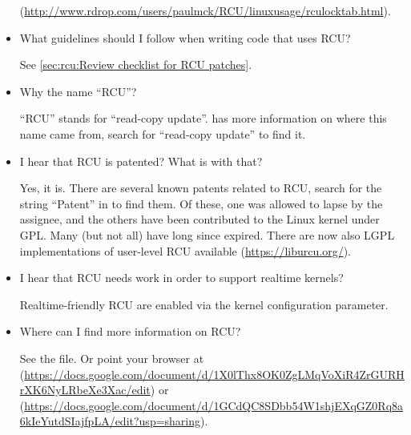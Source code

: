 \begin{itemize}
  (\url{http://www.rdrop.com/users/paulmck/RCU/linuxusage/rculocktab.html}).

\item What guidelines should I follow when writing code that uses RCU\@?

  See \cref{sec:rcu:Review checklist for RCU patches}.

\item Why the name ``RCU\@''?

  ``RCU'' stands for ``read-copy update''.
  has more information on where this name came from, search
  for ``read-copy update'' to find it.

\item I hear that RCU is patented?
  What is with that?

  Yes, it is.
  There are several known patents related to RCU,
  search for the string ``Patent'' in  to find them.
  Of these, one was allowed to lapse by the assignee, and the
  others have been contributed to the Linux kernel under GPL\@.
  Many (but not all) have long since expired.
  There are now also LGPL implementations of user-level RCU
  available (\url{https://liburcu.org/}).

\item I hear that RCU needs work in order to support realtime kernels?

  Realtime-friendly RCU are enabled via the 
  kernel configuration parameter.

\item Where can I find more information on RCU\@?

  See the  file.
  Or point your browser at (\url{https://docs.google.com/document/d/1X0lThx8OK0ZgLMqVoXiR4ZrGURHrXK6NyLRbeXe3Xac/edit})
  or (\url{https://docs.google.com/document/d/1GCdQC8SDbb54W1shjEXqGZ0Rq8a6kIeYutdSIajfpLA/edit?usp=sharing}).
\end{itemize}
